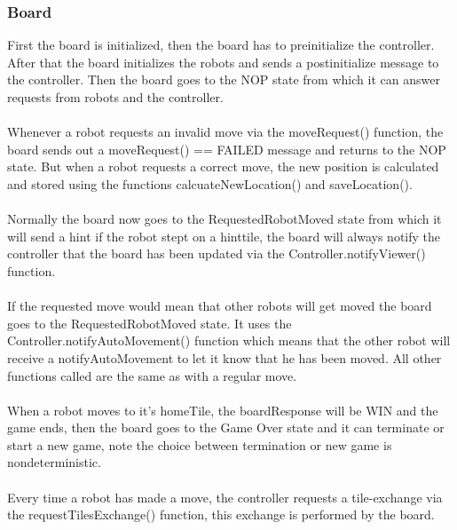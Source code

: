     \subsubsection{Board}
	First the board is initialized, then the board has to preinitialize the controller. After that the board initializes the robots and sends a postinitialize message to the controller. Then the board goes to the NOP state from which it can answer requests from robots and the controller. \\
\\
Whenever a robot requests an invalid move via the moveRequest() function, the board sends out a moveRequest() == FAILED message and returns to the NOP state. But when a robot requests a correct move, the new position is calculated and stored using the functions calcuateNewLocation() and saveLocation(). \\
\\
Normally the board now goes to the RequestedRobotMoved state from which it will send a hint if the robot stept on a hinttile, the board will always notify the controller that the board has been updated via the Controller.notifyViewer() function.\\
\\
If the requested move would mean that other robots will get moved the board goes to the RequestedRobotMoved state. It uses the Controller.notifyAutoMovement() function which means that the other robot will receive a notifyAutoMovement to let it know that he has been moved. All other functions called are the same as with a regular move.\\
\\
When a robot moves to it's homeTile, the boardResponse will be WIN and the game ends, then the board goes to the Game Over state and it can terminate or start a new game, note the choice between termination or new game is nondeterministic.\\
\\
Every time a robot has made a move, the controller requests a tile-exchange via the requestTilesExchange() function, this exchange is performed by the board.\\
	
